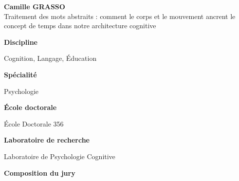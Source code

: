 \vspace{1em}

\begin{center}
	\Huge \textbf{Camille GRASSO}\\
    \vspace{1em}
	\LARGE Traitement des mots abstraits : comment le corps et le mouvement ancrent le concept de temps dans notre architecture cognitive
\\
\end{center}

\singlespacing

\vspace{2em}

\begin{center}
	\begin{minipage}[t]{.35\linewidth}
    	    \vspace{.5em}
        	\textbf{Discipline}

        	Cognition, Langage, Éducation

    	    \vspace{1em}
        	\textbf{Spécialité}

        	Psychologie

    	    \vspace{1em}
        	\textbf{École doctorale}

        	École Doctorale 356

    	    \vspace{1em}
        	\textbf{Laboratoire de recherche}

        	Laboratoire de Psychologie Cognitive

	\end{minipage}\hfill
	\begin{minipage}[t]{.03\linewidth}
	    \dvertline{4pt}{-20em}
	\end{minipage}\hfill
	\begin{minipage}[t]{.6\linewidth}
	    \vspace{0.5em}
    	\textbf{Composition du jury}


\end{minipage}
\end{center}
